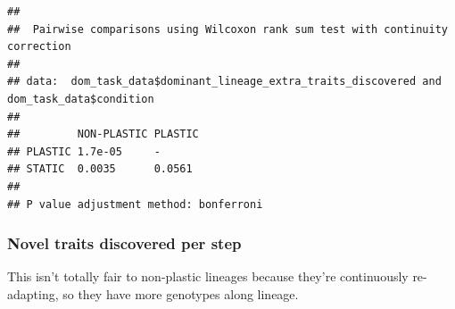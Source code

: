 \documentclass[]{book}
\newenvironment{Shaded}{\begin{snugshade}}{\end{snugshade}}
\newcommand{\DataTypeTok}[1]{\textcolor[rgb]{0.13,0.29,0.53}{#1}}
\newcommand{\FloatTok}[1]{\textcolor[rgb]{0.00,0.00,0.81}{#1}}
\newcommand{\KeywordTok}[1]{\textcolor[rgb]{0.13,0.29,0.53}{\textbf{#1}}}
\newcommand{\NormalTok}[1]{#1}
\newcommand{\OperatorTok}[1]{\textcolor[rgb]{0.81,0.36,0.00}{\textbf{#1}}}
\newcommand{\OtherTok}[1]{\textcolor[rgb]{0.56,0.35,0.01}{#1}}
\newcommand{\StringTok}[1]{\textcolor[rgb]{0.31,0.60,0.02}{#1}}
\begin{document}
\begin{Shaded}
\end{Shaded}

\begin{verbatim}
## 
##  Pairwise comparisons using Wilcoxon rank sum test with continuity correction 
## 
## data:  dom_task_data$dominant_lineage_extra_traits_discovered and dom_task_data$condition 
## 
##         NON-PLASTIC PLASTIC
## PLASTIC 1.7e-05     -      
## STATIC  0.0035      0.0561 
## 
## P value adjustment method: bonferroni
\end{verbatim}

\hypertarget{novel-traits-discovered-per-step}{%
\subsubsection{Novel traits discovered per step}\label{novel-traits-discovered-per-step}}

This isn't totally fair to non-plastic lineages because they're continuously re-adapting, so they have
more genotypes along lineage.
\end{document}
